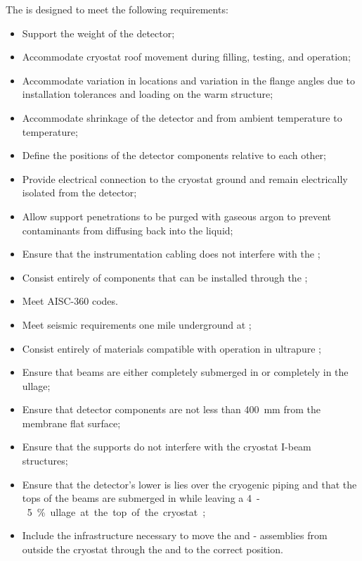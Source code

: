 The  is designed to meet the following  requirements:
\begin{itemize}
 \setlength\itemsep{1mm}
\setlength{\parsep}{1mm}
\setlength{\itemsep}{-5mm}
\item Support the weight of the detector;
\item Accommodate cryostat roof movement during filling, testing, and operation;
\item Accommodate variation in \fdth locations and
  variation in the flange angles due to installation tolerances and
  loading on the warm structure;
\item Accommodate shrinkage of the detector and  from ambient
  temperature to  temperature;
\item Define the positions of the detector components relative to each other; 
\item Provide electrical connection to the cryostat ground and remain electrically isolated from the detector;
\item Allow support penetrations to be purged with gaseous argon to prevent contaminants from diffusing back into the liquid; 
\item Ensure that the instrumentation cabling does not interfere with the ;
\item Consist entirely of components that can  
be installed through the ;
\item Meet AISC-360 codes. %
\item Meet seismic requirements one mile underground at ;
\item Consist entirely of materials compatible %
with operation in ultrapure ;
\item Ensure that beams are either completely submerged in  or completely in the ullage;  
\item Ensure that detector components are not less than \SI{400}{mm} from the membrane flat surface;
\item Ensure that the supports do not interfere with the cryostat I-beam structures;
\item Ensure that the detector's lower  is lies over the cryogenic piping and that the tops of the  beams are submerged in  while leaving a \SI{4}-\SI{5}{\%} ullage at the top of the cryostat; 
\item Include the infrastructure necessary to move the  and
  - assemblies from outside the cryostat through the
   and to the correct position.
\end{itemize}

